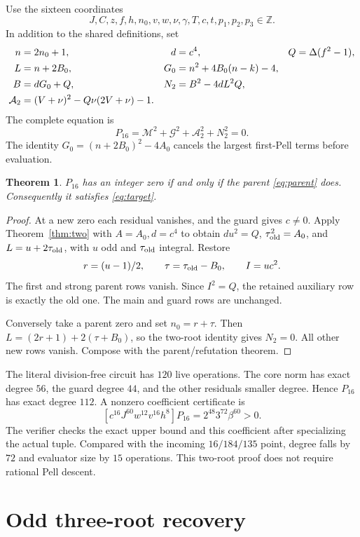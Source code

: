 \documentclass[11pt,letterpaper]{article}
\newtheorem{theorem}{Theorem}[section]
\theoremstyle{remark}\newtheorem{remark}[theorem]{Remark}
\newcommand{\Z}{\mathbb Z}\newcommand{\N}{\mathbb N}\newcommand{\Q}{\mathbb Q}
\begin{document}
Use the sixteen coordinates
\[
 J,C,z,f,h,n_0,v,w,\nu,\gamma,T,c,t,p_1,p_2,p_3\in\Z.
\]
In addition to the shared definitions, set
\begin{align}
 n&=2n_0+1,&d&=c^4,&Q&=\Delta(f^2-1),\notag\\
 L&=n+2B_0,&G_0&=n^2+4B_0(n-k)-4,\notag\\
 B&=dG_0+Q,&N_2&=B^2-4dL^2Q,\label{eq:16norm}\\
 \mathcal A_2&=(V+\nu)^2-Q\nu(2V+\nu)-1.\notag
\end{align}
The complete equation is
\begin{equation}\label{eq:P16}
 \boxed{P_{16}=\mathcal M^2+\mathcal G^2+\mathcal A_2^2+N_2^2=0.}
\end{equation}
The identity $G_0=(n+2B_0)^2-4A_0$ cancels the largest first-Pell
terms before evaluation.

\begin{theorem}\label{thm:16}
$P_{16}$ has an integer zero if and only if the parent
\eqref{eq:parent} does. Consequently it satisfies \eqref{eq:target}.
\end{theorem}
\begin{proof}
At a new zero each residual vanishes, and the guard gives $c\ne0$.
Apply Theorem~\ref{thm:two} with $A=A_0,d=c^4$ to obtain
$du^2=Q$, $\tau_{\rm old}^2=A_0$, and $L=u+2\tau_{\rm old}$,
with $u$ odd and $\tau_{\rm old}$ integral. Restore
\[
 r=(u-1)/2,\qquad \tau=\tau_{\rm old}-B_0,\qquad I=uc^2.
\]
The first and strong parent rows vanish. Since $I^2=Q$, the retained
auxiliary row is exactly the old one. The main and guard rows are unchanged.

Conversely take a parent zero and set $n_0=r+\tau$.
Then $L=(2r+1)+2(\tau+B_0)$, so the two-root identity gives $N_2=0$.
All other new rows vanish. Compose with the parent/refutation theorem.
\end{proof}

The literal division-free circuit has $120$ live operations. The core
norm has exact degree $56$, the guard degree $44$, and the other
residuals smaller degree. Hence $P_{16}$ has exact degree $112$.
A nonzero coefficient certificate is
\[
 [c^{16}J^{60}w^{12}v^{16}h^8]P_{16}
   =2^{48}3^{72}\beta^{60}>0.
\]
The verifier checks the exact upper bound and this coefficient after
specializing the actual tuple. Compared with the incoming $16/184/135$
point, degree falls by $72$ and evaluator size by $15$ operations.
This two-root proof does not require rational Pell descent.

\section{Odd three-root recovery}\label{sec:three}
\end{document}
